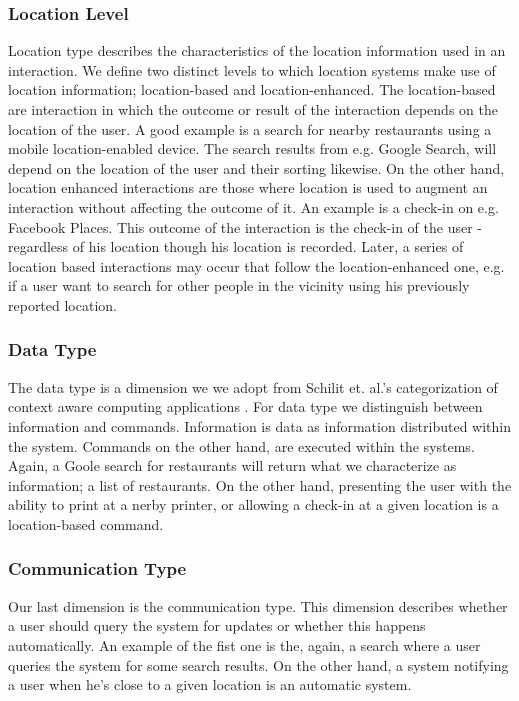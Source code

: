 \subsubsection{Location Level}
Location type describes the characteristics of the location information used in an interaction. We define two distinct levels to which location systems make use of location information; location-based and location-enhanced. The location-based are interaction in which the outcome or result of the interaction depends on the location of the user. A good example is a search for nearby restaurants using a mobile location-enabled device. The search results from e.g. Google Search, will depend on the location of the user and their sorting likewise. On the other hand, location enhanced interactions are those where location is used to augment an interaction without affecting the outcome of it. An example is a check-in on e.g. Facebook Places. This outcome of the interaction is the check-in of the user - regardless of his location though his location is recorded. Later, a series of location based interactions may occur that follow the location-enhanced one, e.g. if a user want to search for other people in the vicinity using his previously reported location.

\subsubsection{Data Type}
The data type is a dimension we we adopt from Schilit et. al.'s categorization of context aware computing applications \cite{512740}. For data type we distinguish between information and commands. Information is data as information distributed within the system. Commands on the other hand, are executed within the systems. Again, a Goole search for restaurants will return what we characterize as information; a list of restaurants. On the other hand, presenting the user with the ability to print at a nerby printer, or allowing a check-in at a given location is a location-based command.

\subsubsection{Communication Type}
\label{sub:communication.type}
Our last dimension is the communication type. This dimension describes whether a user should query the system for updates or whether this happens automatically. An example of the fist one is the, again, a search where a user queries the system for some search results. On the other hand, a system notifying a user when he's close to a given location is an automatic system.  

